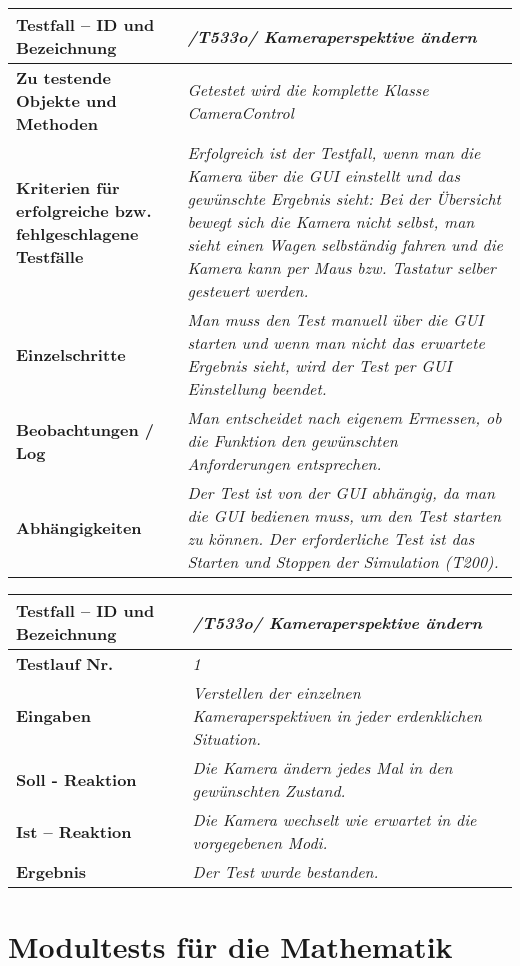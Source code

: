 \begin{longtable}{|p{7cm}|p{10cm}|}
\hline
\textbf{Testfall -- ID und Bezeichnung} &  \textit{/T533o/ Kameraperspektive ändern} \\
\hline
\textbf{Zu testende Objekte und Methoden} &  \textit{Getestet wird die komplette Klasse CameraControl}
\\
\hline
\textbf{Kriterien für erfolgreiche bzw. fehlgeschlagene Testfälle} &
\textit{Erfolgreich ist der Testfall, wenn man die Kamera über die GUI einstellt und das gewünschte Ergebnis sieht: Bei der Übersicht bewegt sich die Kamera nicht selbst, man sieht einen Wagen selbständig fahren und die Kamera kann per Maus bzw. Tastatur selber gesteuert werden. } \\
\hline
\textbf{Einzelschritte} &  \textit{Man muss den Test manuell über die GUI starten und wenn man nicht das erwartete Ergebnis sieht, wird der Test per GUI Einstellung beendet.} \\
\hline
\textbf{Beobachtungen / Log} &  \textit{Man entscheidet nach eigenem Ermessen, ob die Funktion den gewünschten Anforderungen entsprechen.} \\
\hline
\textbf{Abhängigkeiten} &  \textit{Der Test ist von der GUI abhängig, da man die GUI bedienen muss, um den Test starten zu können. Der erforderliche Test ist das Starten und Stoppen der Simulation (T200).} \\
\hline
\end{longtable}

\begin{longtable}{|p{7cm}|p{10cm}|}
\hline
\textbf{Testfall -- ID und Bezeichnung} & \textit{/T533o/ Kameraperspektive ändern} \\
\hline
\textbf{Testlauf Nr.} & \textit{1} \\
\hline
\textbf{Eingaben} & \textit{Verstellen der einzelnen Kameraperspektiven in jeder erdenklichen Situation.} \\
\hline
\textbf{Soll - Reaktion} & \textit{Die Kamera ändern jedes Mal in den gewünschten Zustand.} \\
\hline
\textbf{Ist -- Reaktion} & \textit{Die Kamera wechselt wie erwartet in die vorgegebenen Modi.} \\
\hline
\textbf{Ergebnis} & \textit{Der Test wurde bestanden.} \\
\hline
\end{longtable}


\section{Modultests für die Mathematik}

